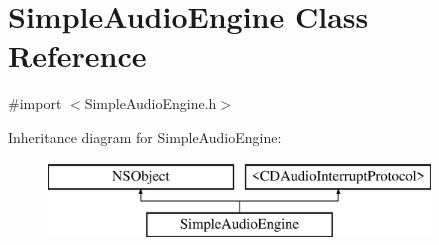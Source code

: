 \hypertarget{interface_simple_audio_engine}{\section{Simple\-Audio\-Engine Class Reference}
\label{interface_simple_audio_engine}
}


{\ttfamily \#import $<$Simple\-Audio\-Engine.\-h$>$}

Inheritance diagram for Simple\-Audio\-Engine\-:\begin{figure}[H]
\begin{center}
\leavevmode
\includegraphics[height=2.000000cm]{interface_simple_audio_engine}
\end{center}
\end{figure}
